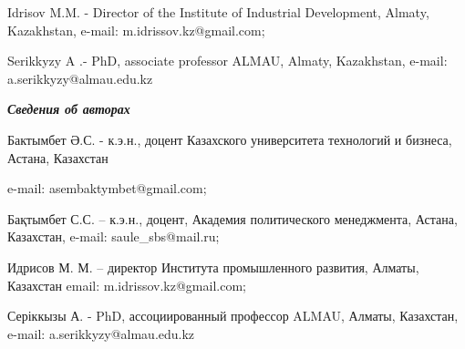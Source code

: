 Idrisov M.M. - Director of the Institute of Industrial Development,
Almaty, Kazakhstan, e-mail: m.idrissov.kz@gmail.com;

Serikkyzy A .- PhD, associate professor ALMAU, Almaty, Kazakhstan,
e-mail: a.serikkyzy@almau.edu.kz

\emph{{\bfseries Сведения об авторах}}

Бактымбет Ә.С. - к.э.н., доцент Казахского университета технологий и
бизнеса, Астана, Казахстан

e-mail: asembaktymbet@gmail.com;

Бақтымбет С.С. -- к.э.н., доцент, Академия политического менеджмента,
Астана, Казахстан, e-mail: saule\_sbs@mail.ru;

Идрисов М. М. -- директор Института промышленного развития, Алматы,
Казахстан email: m.idrissov.kz@gmail.com;

Серіккызы А. - PhD, ассоциированный профессор ALMAU, Алматы, Казахстан,
e-mail: a.serikkyzy@almau.edu.kz







